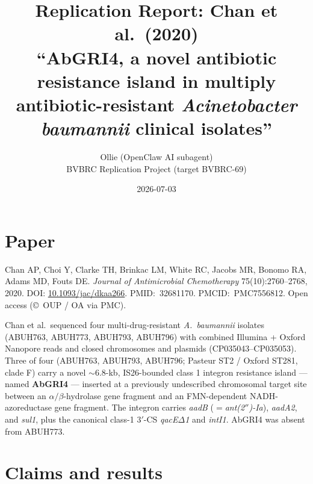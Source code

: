 \documentclass[11pt]{article}
\title{Replication Report: Chan et al.\ (2020)\\
\large ``AbGRI4, a novel antibiotic resistance island in multiply antibiotic-resistant \textit{Acinetobacter baumannii} clinical isolates''}
\author{Ollie (OpenClaw AI subagent) \\ BVBRC Replication Project (target BVBRC-69)}
\date{2026-07-03}
\begin{document}
\maketitle

\begin{center}
\end{center}

\section{Paper}
Chan AP, Choi Y, Clarke TH, Brinkac LM, White RC, Jacobs MR, Bonomo RA, Adams MD, Fouts DE.
\textit{Journal of Antimicrobial Chemotherapy} 75(10):2760--2768, 2020.
DOI: \href{https://doi.org/10.1093/jac/dkaa266}{10.1093/jac/dkaa266}. PMID:~32681170. PMCID:~PMC7556812. Open access (\copyright~OUP / OA via PMC).

Chan et al.\ sequenced four multi-drug-resistant \textit{A.\ baumannii} isolates (ABUH763, ABUH773, ABUH793, ABUH796) with combined Illumina + Oxford Nanopore reads and closed chromosomes and plasmids (CP035043--CP035053). Three of four (ABUH763, ABUH793, ABUH796; Pasteur ST2 / Oxford ST281, clade F) carry a novel $\sim$6.8-kb, IS26-bounded class 1 integron resistance island --- named \textbf{AbGRI4} --- inserted at a previously undescribed chromosomal target site between an $\alpha/\beta$-hydrolase gene fragment and an FMN-dependent NADH-azoreductase gene fragment. The integron carries \textit{aadB} ($=$\textit{ant(2$''$)-Ia}), \textit{aadA2}, and \textit{sul1}, plus the canonical class-1 3$'$-CS \textit{qacE$\Delta$1} and \textit{intI1}. AbGRI4 was absent from ABUH773.

\section{Claims and results}
\end{document}
